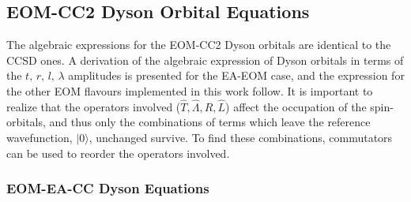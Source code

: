 \subsection{EOM-CC2 Dyson Orbital Equations\label{sec:theory_dyson}}

The algebraic expressions for the EOM-CC2 Dyson orbitals are identical to the CCSD ones. A derivation of the algebraic expression of Dyson orbitals in terms of the $t,\, r,\, l,\, \lambda$ amplitudes is presented for the EA-EOM case, and the expression for the other EOM flavours implemented in this work follow.
It is important to realize that the operators involved ($\hat{T},\hat{\Lambda},\hat{R},\hat{L}$) affect the occupation of the spin-orbitals, and thus only the combinations of terms which leave the reference wavefunction, $| 0 \rangle$, unchanged survive. To find these combinations, commutators can be used to reorder the operators involved.

\subsubsection{EOM-EA-CC Dyson Equations}\label{sec:theory_eom_ea_dyson}

